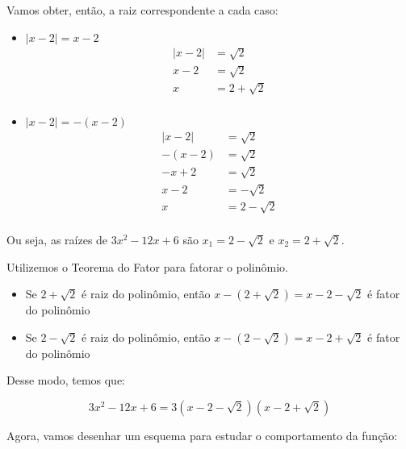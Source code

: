 \documentclass{article}
\begin{document}
Vamos obter, então, a raiz correspondente a cada caso:

\begin{itemize}
    \item \(|x - 2| = x - 2\)
          \begin{align*}
              |x - 2| & = \sqrt{2}     \\
              x - 2   & = \sqrt{2}     \\
              x       & = 2 + \sqrt{2} \\
          \end{align*}
    \item \(|x - 2| = -(x - 2)\)
          \begin{align*}
              |x - 2|  & = \sqrt{2}    \\
              -(x - 2) & = \sqrt{2}    \\
              -x + 2   & = \sqrt{2}    \\
              x - 2    & = -\sqrt{2}   \\
              x        & = 2 -\sqrt{2} \\
          \end{align*}
\end{itemize}

Ou seja, as raízes de \(3x^{2}-12x+ 6\) são \(x_1 = 2 -\sqrt{2}\) e \(x_2 = 2 + \sqrt{2}\).

Utilizemos o Teorema do Fator para fatorar o polinômio.

\begin{itemize}
    \item Se \( 2 + \sqrt{2}\) é raiz do polinômio,
          então \(x-(2 + \sqrt{2}) = x - 2 - \sqrt{2}\) é fator do polinômio
    \item Se \( 2 - \sqrt{2}\) é raiz do polinômio,
          então \(x-(2 - \sqrt{2}) = x - 2 + \sqrt{2}\) é fator do polinômio
\end{itemize}

Desse modo, temos que:

\begin{equation}
    3x^{2}-12x+ 6 = 3(x - 2 - \sqrt{2})(x - 2 + \sqrt{2})
\end{equation}

Agora, vamos desenhar um esquema para estudar o comportamento da função:
\end{document}
